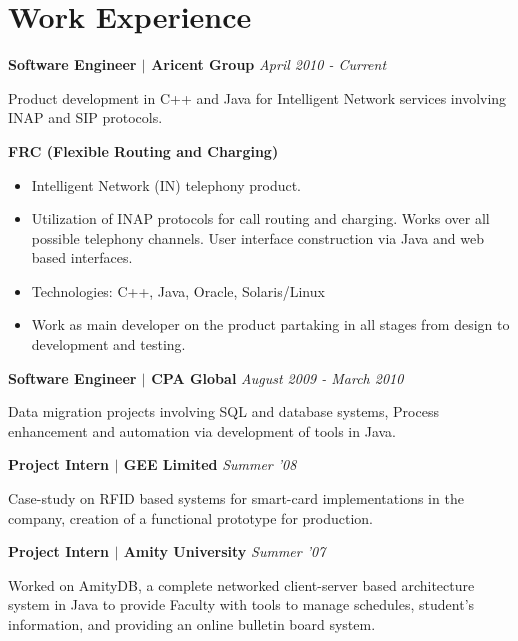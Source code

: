 \documentclass{article}
\begin{document}
\begin{minipage}[c]{0.6\textwidth}

\section*{{\color{green} Work Experience}}

\begin{description}

\item
{\bfseries Software Engineer $ \mid $ Aricent Group} \textit{April 2010 - Current}

Product development in C++ and Java for Intelligent Network
services involving INAP and SIP protocols.

{\bfseries FRC (Flexible Routing and Charging)}
\begin{itemize}\addtolength{\itemsep}{-0.4\baselineskip}
\item Intelligent Network (IN) telephony product.
\item Utilization of INAP protocols for call routing and charging. Works over all possible
telephony channels. User interface construction via Java and web based interfaces.
\item Technologies: C++, Java, Oracle, Solaris/Linux
\item Work as main developer on the product partaking in all stages from design to
development and testing.
\end{itemize}

\item
{\bfseries Software Engineer  $ \mid $ CPA Global} \textit{August 2009 - March 2010}

Data migration projects involving SQL and database systems, Process
enhancement and automation via development of tools in Java.

\item
{\bfseries Project Intern  $ \mid $ GEE Limited}  \textit{Summer '08}

Case-study on RFID based systems for smart-card implementations in the company, 
creation of a functional prototype for production.

\item
{\bfseries Project Intern  $ \mid $ Amity University} \textit{Summer '07}

Worked on AmityDB, a complete networked client-server based architecture system in
Java to provide Faculty with tools to manage schedules, student's information, and
providing an online bulletin board system.


\end{description}
\end{minipage}
\end{document}
